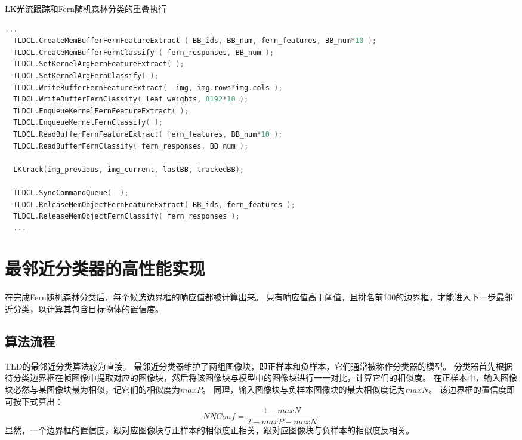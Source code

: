 \begin{table}
\caption{LK光流跟踪和Fern随机森林分类的重叠执行}
\label{lkferncode}
\begin{lstlisting}[language=C++, basicstyle=\ttfamily\footnotesize]    
  ...
  TLDCL.CreateMemBufferFernFeatureExtract ( BB_ids, BB_num, fern_features, BB_num*10 );
  TLDCL.CreateMemBufferFernClassify ( fern_responses, BB_num );
  TLDCL.SetKernelArgFernFeatureExtract( );
  TLDCL.SetKernelArgFernClassify( );
  TLDCL.WriteBufferFernFeatureExtract(  img, img.rows*img.cols );
  TLDCL.WriteBufferFernClassify( leaf_weights, 8192*10 );
  TLDCL.EnqueueKernelFernFeatureExtract( );
  TLDCL.EnqueueKernelFernClassify( );
  TLDCL.ReadBufferFernFeatureExtract( fern_features, BB_num*10 );
  TLDCL.ReadBufferFernClassify( fern_responses, BB_num );
    
  LKtrack(img_previous, img_current, lastBB, trackedBB);
    
  TLDCL.SyncCommandQueue(  );
  TLDCL.ReleaseMemObjectFernFeatureExtract( BB_ids, fern_features );
  TLDCL.ReleaseMemObjectFernClassify( fern_responses );
  ...
\end{lstlisting}
\end{table}


\section{最邻近分类器的高性能实现}
在完成Fern随机森林分类后，每个候选边界框的响应值都被计算出来。
只有响应值高于阈值，且排名前100的边界框，才能进入下一步最邻近分类，以计算其包含目标物体的置信度。

\subsection{算法流程}
TLD的最邻近分类算法较为直接。
最邻近分类器维护了两组图像块，即正样本和负样本，它们通常被称作分类器的模型。
分类器首先根据待分类边界框在帧图像中提取对应的图像块，然后将该图像块与模型中的图像块进行一一对比，计算它们的相似度。
在正样本中，输入图像块必然与某图像块最为相似，记它们的相似度为$maxP$。
同理，输入图像块与负样本图像块的最大相似度记为$maxN$。
该边界框的置信度即可按下式算出：
\begin{equation}
\label{nnconfeq}
NNConf = \frac{1-maxN}{2-maxP-maxN} .
\end{equation}
显然，一个边界框的置信度，跟对应图像块与正样本的相似度正相关，跟对应图像块与负样本的相似度反相关。

